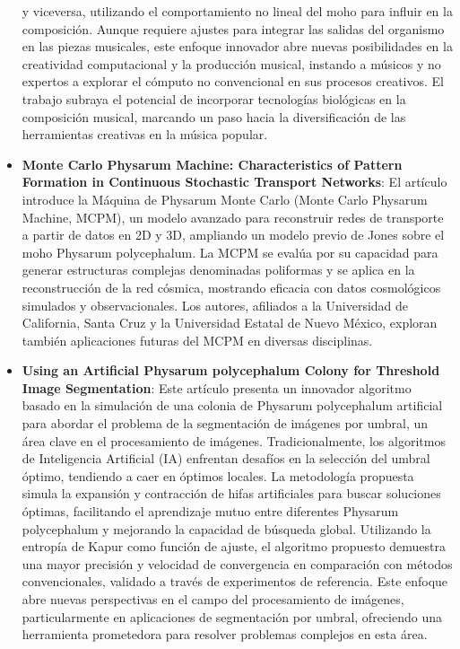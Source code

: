 \begin{itemize}
            y viceversa, utilizando el comportamiento no lineal del moho para influir en la composici\'on. Aunque requiere ajustes para integrar las salidas 
            del organismo en las piezas musicales, este enfoque innovador abre nuevas posibilidades en la creatividad computacional y la producci\'on musical, 
            instando a m\'usicos y no expertos a explorar el c\'omputo no convencional en sus procesos creativos. El trabajo subraya el potencial de incorporar 
            tecnolog\'ias biol\'ogicas en la composici\'on musical, marcando un paso hacia la diversificaci\'on de las herramientas creativas en la m\'usica popular. \cite{NIME20_98}
        \item \textbf{Monte Carlo Physarum Machine: Characteristics of Pattern Formation in Continuous Stochastic Transport Networks}: 
            El art\'iculo introduce la M\'aquina de Physarum Monte Carlo (Monte Carlo Physarum Machine, MCPM), un modelo avanzado para reconstruir redes de transporte a partir 
            de datos en 2D y 3D, ampliando un modelo previo de Jones sobre el moho Physarum polycephalum. La MCPM se eval\'ua por su capacidad 
            para generar estructuras complejas denominadas poliformas y se aplica en la reconstrucci\'on de la red c\'osmica, mostrando eficacia 
            con datos cosmol\'ogicos simulados y observacionales. Los autores, afiliados a la Universidad de California, Santa Cruz y la Universidad 
            Estatal de Nuevo M\'exico, exploran tambi\'en aplicaciones futuras del MCPM en diversas disciplinas. \cite{Elek2022}
        \item \textbf{Using an Artificial Physarum polycephalum Colony for Threshold Image Segmentation}: Este art\'iculo presenta un innovador 
            algoritmo basado en la simulaci\'on de una colonia de Physarum polycephalum artificial para abordar el problema de la segmentaci\'on de 
            im\'agenes por umbral, un \'area clave en el procesamiento de im\'agenes. Tradicionalmente, los algoritmos de Inteligencia Artificial (IA)
            enfrentan desaf\'ios en la selecci\'on del umbral \'optimo, tendiendo a caer en \'optimos locales. La metodolog\'ia propuesta simula la 
            expansi\'on y contracci\'on de hifas artificiales para buscar soluciones \'optimas, facilitando el aprendizaje mutuo entre diferentes 
            Physarum polycephalum y mejorando la capacidad de b\'usqueda global. Utilizando la entrop\'ia de Kapur como funci\'on de ajuste, el 
            algoritmo propuesto demuestra una mayor precisi\'on y velocidad de convergencia en comparaci\'on con m\'etodos convencionales, validado 
            a trav\'es de experimentos de referencia. Este enfoque abre nuevas perspectivas en el campo del procesamiento de im\'agenes, 
            particularmente en aplicaciones de segmentaci\'on por umbral, ofreciendo una herramienta prometedora para resolver problemas complejos en esta \'area. \cite{Cai2023}
    \end{itemize}
